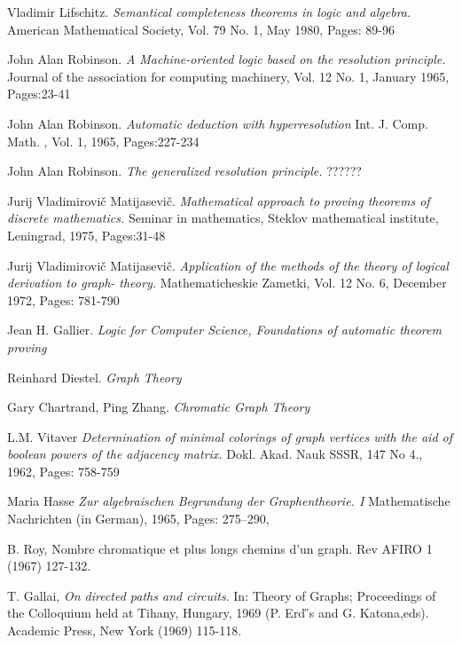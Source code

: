 \documentclass[a4paper,12pt,twoside]{book}
\begin{document}
\newpage
{}
{}
\begin{thebibliography}{9}
Vladimir Lifschitz.
\textit{Semantical completeness theorems in logic and algebra.} 
American Mathematical Society, Vol. 79 No. 1, May 1980, Pages: 89-96 
 
John Alan Robinson.  
\textit{A Machine-oriented logic based on the resolution principle.} 
Journal of the association for computing machinery, Vol. 12 No. 1, January 1965, Pages:23-41

John Alan Robinson.  
\textit{Automatic deduction with hyperresolution} 
Int. J. Comp. Math. , Vol. 1, 1965, Pages:227-234
 
John Alan Robinson.  
\textit{The generalized resolution principle.} 
??????

Jurij Vladimirovi\v{c} Matijasevi\v{c}.
\textit{Mathematical approach to proving theorems of discrete mathematics.} 
Seminar in mathematics, Steklov mathematical institute, Leningrad, 1975, Pages:31-48

Jurij Vladimirovi\v{c} Matijasevi\v{c}.
\textit{Application of the methods of the theory of logical derivation to graph- theory.} Mathematicheskie Zametki, Vol. 12 No. 6, December 1972, Pages: 781-790
 
 Jean H. Gallier. \textit{Logic for Computer Science, Foundations of automatic theorem proving }

 Reinhard Diestel. \textit{Graph Theory}

 Gary Chartrand, Ping Zhang. \textit{Chromatic Graph Theory}

 L.M. Vitaver \textit{Determination of minimal colorings of graph vertices with the aid of boolean powers of the adjacency matrix.} Dokl. Akad. Nauk SSSR, 147 No 4., 1962, Pages: 758-759

 Maria Hasse \textit{Zur algebraischen Begrundung der Graphentheorie. I} Mathematische Nachrichten (in German), 1965, Pages: 275–290,

B. Roy, Nombre chromatique et plus longs chemins d’un graph. Rev AFIRO
1 (1967) 127-132.

T. Gallai, \textit{On directed paths and circuits}. In: Theory of Graphs; Proceedings of the Colloquium held at Tihany, Hungary, 1969 (P. Erd ̋s and G. Katona,eds). Academic Press, New York (1969) 115-118.





\end{thebibliography}
\end{document}
